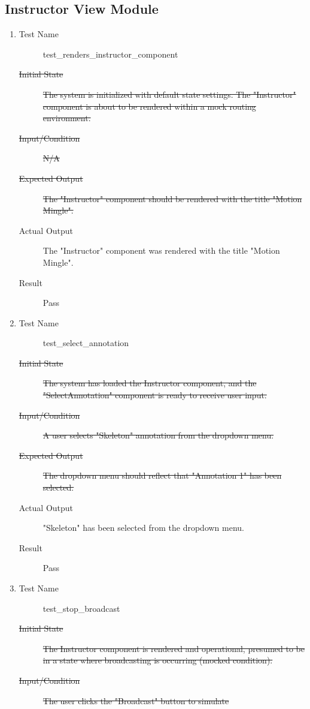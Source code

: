 \documentclass[12pt, titlepage]{article}
\begin{document}
\subsection{Instructor View Module}
\begin{enumerate}[UT-M1]
\item \label{UT-M1}
  \begin{description}
  \item[Test Name] test\_renders\_instructor\_component
  \item[\sout{Initial State}]\sout{ The system is initialized with default state settings.
    The "Instructor" component is about to be rendered within a mock routing
    environment.
  }\item[\sout{Input/Condition}]\sout{ N/A
  }\item[\sout{Expected Output}]\sout{ The "Instructor" component should be rendered with the
    title "Motion Mingle".
  }\item[Actual Output] The "Instructor" component was rendered with the title
    "Motion Mingle".
  \item[Result] Pass
  \end{description}
\item \label{UT-M2}
  \begin{description}
  \item[Test Name] test\_select\_annotation
  \item[\sout{Initial State}]\sout{ The system has loaded the Instructor component, and the
    "SelectAnnotation" component is ready to receive user input.
  }\item[\sout{Input/Condition}]\sout{ A user selects "Skeleton" annotation from the dropdown
    menu.
  }\item[\sout{Expected Output}]\sout{ The dropdown menu should reflect that "Annotation 1"
    has been selected.
  }\item[Actual Output] "Skeleton" has been selected from the dropdown menu.
  \item[Result] Pass
  \end{description}
\item \label{UT-M3}
  \begin{description}
  \item[Test Name] test\_stop\_broadcast
  \item[\sout{Initial State}]\sout{ The Instructor component is rendered and operational,
    presumed to be in a state where broadcasting is occurring (mocked
    condition).
  }\item[\sout{Input/Condition}]\sout{ The user clicks the "Broadcast" button to simulate
}
\end{description}
\end{enumerate}
\end{document}
